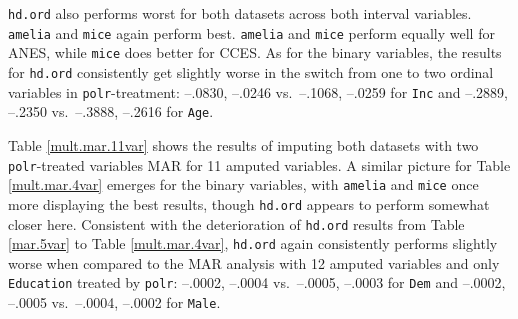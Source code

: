 \documentclass[12pt,econ]{sources/authesis}
\begin{document}
\texttt{hd.ord} also performs worst for both datasets across both interval variables. \texttt{amelia} and \texttt{mice} again perform best. \texttt{amelia} and \texttt{mice} perform equally well for ANES, while \texttt{mice} does better for CCES. As for the binary variables, the results for \texttt{hd.ord} consistently get slightly worse in the switch from one to two ordinal variables in \texttt{polr}-treatment: --.0830, --.0246 vs.~--.1068, --.0259 for \texttt{Inc} and --.2889, --.2350 vs.~--.3888, --.2616 for \texttt{Age}.

Table \ref{mult.mar.11var} shows the results of imputing both datasets with two \texttt{polr}-treated variables MAR for 11 amputed variables. A similar picture for Table \ref{mult.mar.4var} emerges for the binary variables, with \texttt{amelia} and \texttt{mice} once more displaying the best results, though \texttt{hd.ord} appears to perform somewhat closer here. Consistent with the deterioration of \texttt{hd.ord} results from Table \ref{mar.5var} to Table \ref{mult.mar.4var}, \texttt{hd.ord} again consistently performs slightly worse when compared to the MAR analysis with 12 amputed variables and only \texttt{Education} treated by \texttt{polr}: --.0002, --.0004 vs.~--.0005, --.0003 for \texttt{Dem} and --.0002, --.0005 vs.~--.0004, --.0002 for \texttt{Male}.

\ssp
\end{document}
